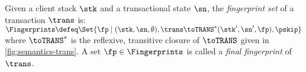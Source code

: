 

\begin{definition}
Given a client stack $\stk$ and a transactional state $\sn$, the \emph{fingerprint set} of a transaction $\trans$ is:
\(
\Fingerprints \defeq \Set{\fp \mid (\stk, \sn, \emptyset), \trans \toTRANS^* (\stk', \sn', \fp), \pskip }
\)
where $\toTRANS^*$ is the reflexive, transitive closure of $\toTRANS$ given in \cref{fig:semantics-trans}.  
A set $\fp \in \Fingerprints$ is called a \emph{final fingerprint} of $\trans$. 
\end{definition}
\noindent 


